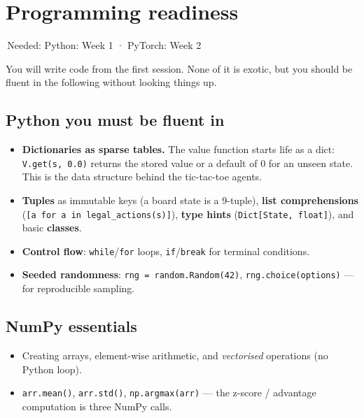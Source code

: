 \documentclass[11pt]{article}
\newcommand{\wk}[1]{{\sffamily\footnotesize\colorbox{slate!12}{\textcolor{slate}{\,Needed: #1\,}}}}
\begin{document}
\section{Programming readiness}
\wk{Python: Week 1 · PyTorch: Week 2}

\vspace{0.4em}
You will write code from the first session. None of it is exotic, but you should be fluent in the following without looking things up.

\subsection{Python you must be fluent in}
\begin{itemize}
\item \textbf{Dictionaries as sparse tables.} The value function starts life as a dict: \texttt{V.get(s, 0.0)} returns the stored value or a default of $0$ for an unseen state. This is the data structure behind the tic-tac-toe agents.
\item \textbf{Tuples} as immutable keys (a board state is a 9-tuple), \textbf{list comprehensions} (\texttt{[a for a in legal\_actions(s)]}), \textbf{type hints} (\texttt{Dict[State, float]}), and basic \textbf{classes}.
\item \textbf{Control flow}: \texttt{while}/\texttt{for} loops, \texttt{if}/\texttt{break} for terminal conditions.
\item \textbf{Seeded randomness}: \texttt{rng = random.Random(42)}, \texttt{rng.choice(options)} — for reproducible sampling.
\end{itemize}

\subsection{NumPy essentials}
\begin{itemize}
\item Creating arrays, element-wise arithmetic, and \emph{vectorised} operations (no Python loop).
\item \texttt{arr.mean()}, \texttt{arr.std()}, \texttt{np.argmax(arr)} — the z-score / advantage computation is three NumPy calls.
\end{itemize}
\end{document}
